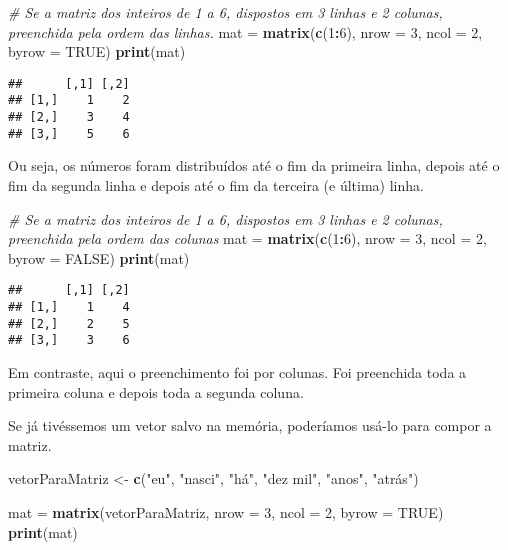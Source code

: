 \documentclass[
]{book}
\newenvironment{Shaded}{\begin{snugshade}}{\end{snugshade}}
\newcommand{\CommentTok}[1]{\textcolor[rgb]{0.56,0.35,0.01}{\textit{#1}}}
\newcommand{\DataTypeTok}[1]{\textcolor[rgb]{0.13,0.29,0.53}{#1}}
\newcommand{\DecValTok}[1]{\textcolor[rgb]{0.00,0.00,0.81}{#1}}
\newcommand{\KeywordTok}[1]{\textcolor[rgb]{0.13,0.29,0.53}{\textbf{#1}}}
\newcommand{\NormalTok}[1]{#1}
\newcommand{\OperatorTok}[1]{\textcolor[rgb]{0.81,0.36,0.00}{\textbf{#1}}}
\newcommand{\OtherTok}[1]{\textcolor[rgb]{0.56,0.35,0.01}{#1}}
\newcommand{\StringTok}[1]{\textcolor[rgb]{0.31,0.60,0.02}{#1}}
\begin{document}
\begin{Shaded}
\begin{Highlighting}[]
\CommentTok{# Se a matriz dos inteiros de 1 a 6, dispostos em 3 linhas e 2 colunas, preenchida pela ordem das linhas.}
\NormalTok{mat =}\StringTok{ }\KeywordTok{matrix}\NormalTok{(}\KeywordTok{c}\NormalTok{(}\DecValTok{1}\OperatorTok{:}\DecValTok{6}\NormalTok{), }\DataTypeTok{nrow =} \DecValTok{3}\NormalTok{, }\DataTypeTok{ncol =} \DecValTok{2}\NormalTok{, }\DataTypeTok{byrow =} \OtherTok{TRUE}\NormalTok{)}
\KeywordTok{print}\NormalTok{(mat)}
\end{Highlighting}
\end{Shaded}

\begin{verbatim}
##      [,1] [,2]
## [1,]    1    2
## [2,]    3    4
## [3,]    5    6
\end{verbatim}

Ou seja, os números foram distribuídos até o fim da primeira linha, depois até o fim da segunda linha e depois até o fim da terceira (e última) linha.

\begin{Shaded}
\begin{Highlighting}[]
\CommentTok{# Se a matriz dos inteiros de 1 a 6, dispostos em 3 linhas e 2 colunas, preenchida pela ordem das colunas}
\NormalTok{mat =}\StringTok{ }\KeywordTok{matrix}\NormalTok{(}\KeywordTok{c}\NormalTok{(}\DecValTok{1}\OperatorTok{:}\DecValTok{6}\NormalTok{), }\DataTypeTok{nrow =} \DecValTok{3}\NormalTok{, }\DataTypeTok{ncol =} \DecValTok{2}\NormalTok{, }\DataTypeTok{byrow =} \OtherTok{FALSE}\NormalTok{)}
\KeywordTok{print}\NormalTok{(mat)}
\end{Highlighting}
\end{Shaded}

\begin{verbatim}
##      [,1] [,2]
## [1,]    1    4
## [2,]    2    5
## [3,]    3    6
\end{verbatim}

Em contraste, aqui o preenchimento foi por colunas. Foi preenchida toda a primeira coluna e depois toda a segunda coluna.

Se já tivéssemos um vetor salvo na memória, poderíamos usá-lo para compor a matriz.

\begin{Shaded}
\begin{Highlighting}[]
\NormalTok{vetorParaMatriz <-}\StringTok{ }\KeywordTok{c}\NormalTok{(}\StringTok{"eu"}\NormalTok{, }\StringTok{"nasci"}\NormalTok{, }\StringTok{"há"}\NormalTok{, }\StringTok{"dez mil"}\NormalTok{, }\StringTok{"anos"}\NormalTok{, }\StringTok{"atrás"}\NormalTok{) }

\NormalTok{mat =}\StringTok{ }\KeywordTok{matrix}\NormalTok{(vetorParaMatriz, }\DataTypeTok{nrow =} \DecValTok{3}\NormalTok{, }\DataTypeTok{ncol =} \DecValTok{2}\NormalTok{, }\DataTypeTok{byrow =} \OtherTok{TRUE}\NormalTok{)}
\KeywordTok{print}\NormalTok{(mat)}
\end{Highlighting}
\end{Shaded}
\end{document}
